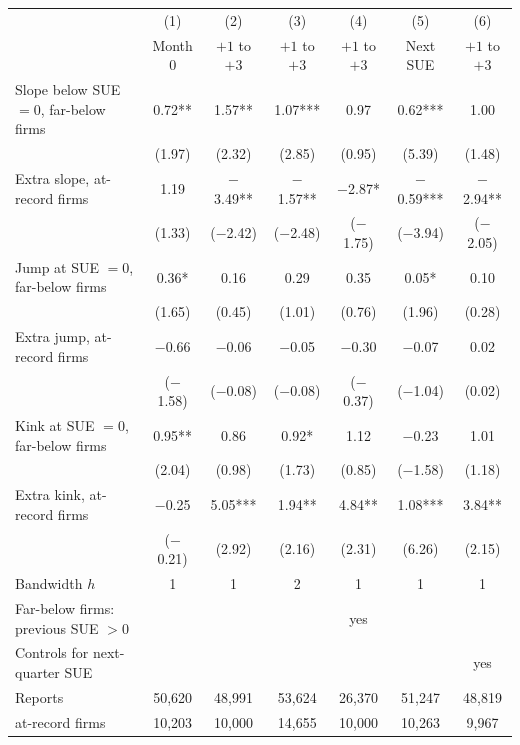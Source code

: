 \begin{tabular}{lcccccc}
\toprule
 & (1) & (2) & (3) & (4) & (5) & (6)\\
 & Month 0 & $+1$ to $+3$ & $+1$ to $+3$ & $+1$ to $+3$ & Next SUE & $+1$ to $+3$\\
\midrule
Slope below SUE $=0$, far-below firms & 0.72** & 1.57** & 1.07*** & 0.97 & 0.62*** & 1.00\\
 & (1.97) & (2.32) & (2.85) & (0.95) & (5.39) & (1.48)\\[1pt]
\quad Extra slope, at-record firms & 1.19 & \ensuremath{-}3.49** & \ensuremath{-}1.57** & \ensuremath{-}2.87* & \ensuremath{-}0.59*** & \ensuremath{-}2.94**\\
 & (1.33) & (\ensuremath{-}2.42) & (\ensuremath{-}2.48) & (\ensuremath{-}1.75) & (\ensuremath{-}3.94) & (\ensuremath{-}2.05)\\[1pt]
Jump at SUE $=0$, far-below firms & 0.36* & 0.16 & 0.29 & 0.35 & 0.05* & 0.10\\
 & (1.65) & (0.45) & (1.01) & (0.76) & (1.96) & (0.28)\\[1pt]
\quad Extra jump, at-record firms & \ensuremath{-}0.66 & \ensuremath{-}0.06 & \ensuremath{-}0.05 & \ensuremath{-}0.30 & \ensuremath{-}0.07 & 0.02\\
 & (\ensuremath{-}1.58) & (\ensuremath{-}0.08) & (\ensuremath{-}0.08) & (\ensuremath{-}0.37) & (\ensuremath{-}1.04) & (0.02)\\[1pt]
Kink at SUE $=0$, far-below firms & 0.95** & 0.86 & 0.92* & 1.12 & \ensuremath{-}0.23 & 1.01\\
 & (2.04) & (0.98) & (1.73) & (0.85) & (\ensuremath{-}1.58) & (1.18)\\[1pt]
\quad Extra kink, at-record firms & \ensuremath{-}0.25 & 5.05*** & 1.94** & 4.84** & 1.08*** & 3.84**\\
 & (\ensuremath{-}0.21) & (2.92) & (2.16) & (2.31) & (6.26) & (2.15)\\[1pt]
\midrule
Bandwidth $h$ & 1 & 1 & 2 & 1 & 1 & 1\\
Far-below firms: previous SUE $>0$ &  &  &  & yes &  & \\
Controls for next-quarter SUE &  &  &  &  &  & yes\\
Reports & 50,620 & 48,991 & 53,624 & 26,370 & 51,247 & 48,819\\
\quad at-record firms & 10,203 & 10,000 & 14,655 & 10,000 & 10,263 & 9,967\\
\bottomrule
\end{tabular}
